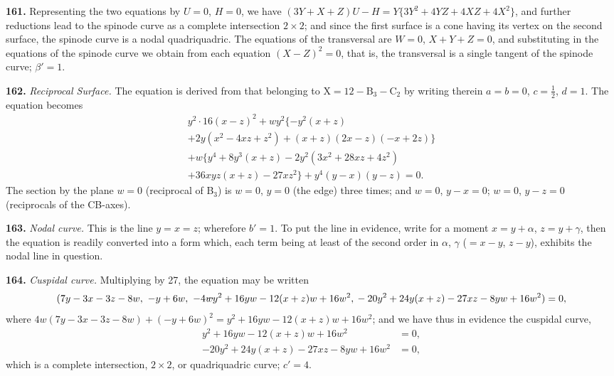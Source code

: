 \documentclass[11pt,a4paper]{article}
\theoremstyle{definition}
\begin{document}
\noindent\textbf{161.} Representing the two equations by $U=0$, $H=0$, we have $(3Y+X+Z)U-H=Y\{3Y^2+4YZ+4XZ+4X^2\}$, and further reductions lead to the spinode curve as a complete intersection $2\times 2$; and since the first surface is a cone having its vertex on the second surface, the spinode curve is a nodal quadriquadric. The equations of the transversal are $W=0$, $X+Y+Z=0$, and substituting in the equations of the spinode curve we obtain from each equation $(X-Z)^2=0$, that is, the transversal is a single tangent of the spinode curve; $\beta'=1$.

\setcounter{page}{435}

\noindent\textbf{162.} \textit{Reciprocal Surface.} The equation is derived from that belonging to $\mathrm{X}=12-\mathrm{B}_3-\mathrm{C}_2$ by writing therein $a=b=0$, $c=\frac{1}{2}$, $d=1$. The equation becomes
\begin{multline*}
y^2\cdot 16(x-z)^2 + wy^2\{-y^2(x+z)\\
+2y(x^2-4xz+z^2)+(x+z)(2x-z)(-x+2z)\} \\
+w\{y^4+8y^3(x+z)-2y^2(3x^2+28xz+4z^2)\\
+36xyz(x+z)-27xz^2\}+y^4(y-x)(y-z)=0.
\end{multline*}
The section by the plane $w=0$ (reciprocal of B$_3$) is $w=0$, $y=0$ (the edge) three times; and $w=0$, $y-x=0$; $w=0$, $y-z=0$ (reciprocals of the CB-axes).

\noindent\textbf{163.} \textit{Nodal curve.} This is the line $y=x=z$; wherefore $b'=1$. To put the line in evidence, write for a moment $x=y+\alpha$, $z=y+\gamma$, then the equation is readily converted into a form which, each term being at least of the second order in $\alpha$, $\gamma$ ($=x-y$, $z-y$), exhibits the nodal line in question.

\setcounter{page}{436}

\noindent\textbf{164.} \textit{Cuspidal curve.} Multiplying by 27, the equation may be written
\[
(7y-3x-3z-8w,\ -y+6w,\ -4w\!\hbox{\hspace{-0.5em}}\raisebox{0.3ex}{$\scriptstyle\frown$}\!y^2+16yw-12(x+z)w+16w^2,\\
-20y^2+24y(x+z)-27xz-8yw+16w^2)=0,
\]
where $4w(7y-3x-3z-8w)+(-y+6w)^2=y^2+16yw-12(x+z)w+16w^2$; and we have thus in evidence the cuspidal curve,
\begin{align*}
y^2+16yw-12(x+z)w+16w^2 &= 0,\\
-20y^2+24y(x+z)-27xz-8yw+16w^2 &= 0,
\end{align*}
which is a complete intersection, $2\times 2$, or quadriquadric curve; $c'=4$.
\end{document}
